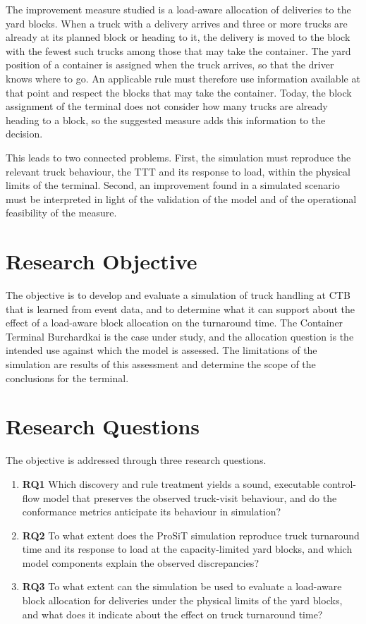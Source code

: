 The improvement measure studied is a load-aware allocation of deliveries to the
yard blocks. When a truck with a delivery arrives and three or more trucks are
already at its planned block or heading to it, the delivery is moved to the block
with the fewest such trucks among those that may take the container. The yard position of a container is assigned when the truck arrives, so that
the driver knows where to go. An applicable rule must therefore use information
available at that point and respect the blocks that may take the container. Today,
the block assignment of the terminal does not consider how many trucks are already heading to a block,
so the suggested measure adds this information to the decision.

This leads to two connected problems. First, the simulation must reproduce the
relevant truck behaviour, the TTT and its response to load, within the physical
limits of the terminal. Second, an improvement found in a simulated scenario must
be interpreted in light of the validation of the model and of the operational
feasibility of the measure.
\section{Research Objective}
The objective is to develop and evaluate a simulation of truck handling at CTB that
is learned from event data, and to determine what it can support about the effect
of a load-aware block allocation on the turnaround time. The Container Terminal Burchardkai is the case under
study, and the allocation question is the intended use against which the model is
assessed. The limitations of the simulation are results of this assessment and
determine the scope of the conclusions for the terminal.

\section{Research Questions}

The objective is addressed through three research questions.
\begin{enumerate}
\item \textbf{RQ1} Which discovery and rule treatment yields a sound,
executable control-flow model that preserves the observed truck-visit
behaviour, and do the conformance metrics anticipate its behaviour in simulation?
\item \textbf{RQ2} To what extent does the ProSiT simulation reproduce truck
turnaround time and its response to load at the capacity-limited yard blocks,
and which model components explain the observed discrepancies?
\item \textbf{RQ3} To what extent can the simulation be used to evaluate a
load-aware block allocation for deliveries under the physical limits of the
yard blocks, and what does it indicate about the effect on truck turnaround
time?
\end{enumerate}


